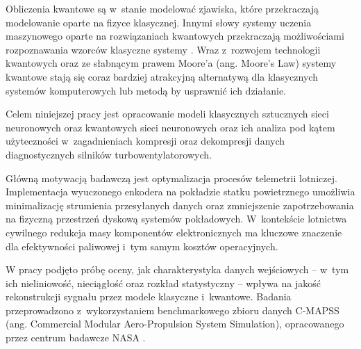Obliczenia kwantowe są w~stanie modelować zjawiska, które przekraczają modelowanie oparte na fizyce klasycznej. Innymi słowy systemy uczenia maszynowego oparte na rozwiązaniach kwantowych przekraczają możliwościami rozpoznawania wzorców klasyczne systemy \cite{romero2017quantum}. Wraz z~rozwojem technologii kwantowych oraz ze słabnącym prawem Moore'a (ang. Moore's Law) systemy kwantowe stają się coraz bardziej atrakcyjną alternatywą dla klasycznych systemów komputerowych lub metodą by usprawnić ich działanie.

Celem niniejszej pracy jest opracowanie modeli klasycznych sztucznych sieci neuronowych oraz kwantowych sieci neuronowych oraz ich analiza pod kątem użyteczności w~zagadnieniach kompresji oraz dekompresji danych diagnostycznych silników turbowentylatorowych.

Główną motywacją badawczą jest optymalizacja procesów telemetrii lotniczej. Implementacja wyuczonego enkodera na pokładzie statku powietrznego umożliwia minimalizację strumienia przesyłanych danych oraz zmniejszenie zapotrzebowania na fizyczną przestrzeń dyskową systemów pokładowych. W~kontekście lotnictwa cywilnego redukcja masy komponentów elektronicznych ma kluczowe znaczenie dla efektywności paliwowej i~tym samym kosztów operacyjnych.

W pracy podjęto próbę oceny, jak charakterystyka danych wejściowych – w~tym ich nieliniowość, nieciągłość oraz rozkład statystyczny – wpływa na jakość rekonstrukcji sygnału przez modele klasyczne i~kwantowe. Badania przeprowadzono z~wykorzystaniem benchmarkowego zbioru danych C-MAPSS (ang. Commercial Modular Aero-Propulsion System Simulation), opracowanego przez centrum badawcze NASA \cite{saxena2008damage}.